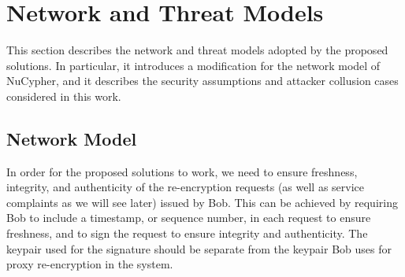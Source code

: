 \section{Network and Threat Models}
\label{threat-network-model}
This section describes the network and threat models adopted by the proposed solutions. In particular, it introduces a modification for the network model of NuCypher, and it describes the security assumptions and attacker collusion cases considered in this work.


\subsection{Network Model}
In order for the proposed solutions to work, we need to ensure freshness, integrity, and authenticity of the re-encryption requests (as well as service complaints as we will see later) issued by Bob. This can be achieved by requiring Bob to include a timestamp, or sequence number, in each request to ensure freshness, and to sign the request to ensure integrity and authenticity. The keypair used for the signature should be separate from the keypair Bob uses for proxy re-encryption in the system. 


